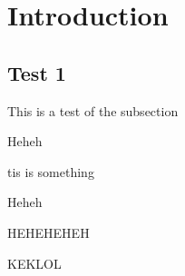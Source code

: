 \section{Introduction}

\subsection[a]{Test 1}

This is a test of the subsection

Heheh 

tis is something

Heheh

HEHEHEHEH


KEKLOL